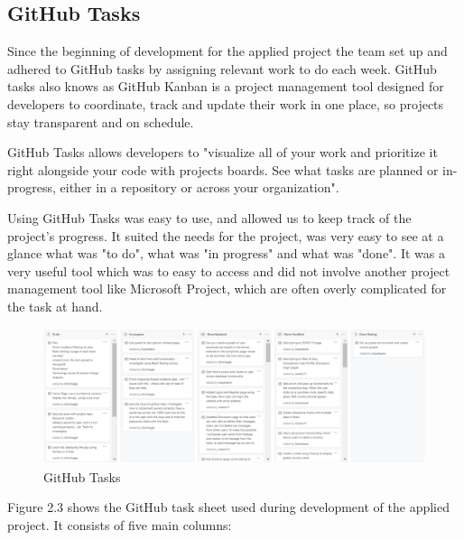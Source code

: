 \subsection{GitHub Tasks}
Since the beginning of development for the applied project the team set up and adhered to GitHub tasks by assigning relevant work to do each week. GitHub tasks also knows as GitHub Kanban is a project management tool designed for developers to coordinate, track and update their work in one place, so projects stay transparent and on schedule.

\vspace{5mm} %

GitHub Tasks allows developers to "visualize all of your work and prioritize it right alongside your code with projects boards. See what tasks are planned or in-progress, either in a repository or across your organization". \cite{GitHubtasks}


\vspace{5mm} %
Using GitHub Tasks was easy to use, and allowed us to keep track of the project's progress.
It suited the needs for the project, was very easy to see at a glance what was "to do", what was "in progress" and what was "done". It was a very useful tool which was to easy to access and did not involve another project management tool like Microsoft Project, which are often overly complicated for the task at hand.


\vspace{5mm} %


\begin{figure}[ht]
    \centering
    \includegraphics[scale=0.50]{img/GitHubToDo.PNG}
    \caption{GitHub Tasks}
    \label{fig:my_label1}
\end{figure}


Figure 2.3 shows the GitHub task sheet used during development of the applied project. It consists of five main columns:

